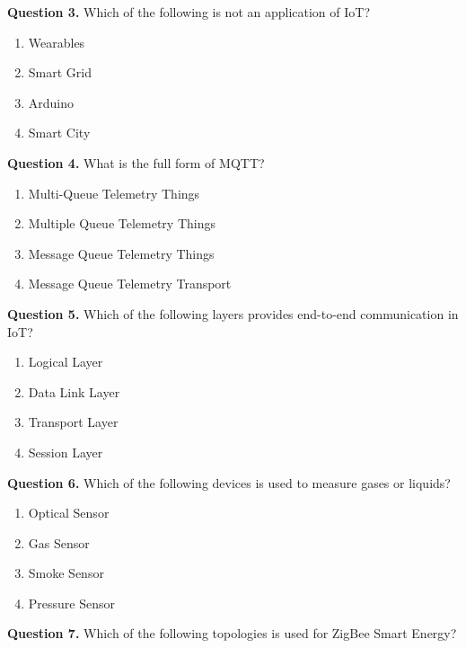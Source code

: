 \documentclass[11pt,a4paper]{article}
\begin{document}
\medskip


\noindent   \textbf{Question 3.} Which of the following is not an application of IoT?

\begin{enumerate}[label=(\alph*),itemsep=2pt]
  \item Wearables
  \item Smart Grid
  \item Arduino
  \item Smart City
\end{enumerate}

\medskip


\noindent   \textbf{Question 4.} What is the full form of MQTT?

\begin{enumerate}[label=(\alph*),itemsep=2pt]
  \item Multi-Queue Telemetry Things
  \item Multiple Queue Telemetry Things
  \item Message Queue Telemetry Things
  \item Message Queue Telemetry Transport
\end{enumerate}

\medskip


\noindent   \textbf{Question 5.} Which of the following layers provides end-to-end communication in IoT?

\begin{enumerate}[label=(\alph*),itemsep=2pt]
  \item Logical Layer
  \item Data Link Layer
  \item Transport Layer
  \item Session Layer
\end{enumerate}

\medskip


\noindent   \textbf{Question 6.} Which of the following devices is used to measure gases or liquids?

\begin{enumerate}[label=(\alph*),itemsep=2pt]
  \item Optical Sensor
  \item Gas Sensor
  \item Smoke Sensor
  \item Pressure Sensor
\end{enumerate}

\medskip


\noindent   \textbf{Question 7.} Which of the following topologies is used for ZigBee Smart Energy?
\end{document}

